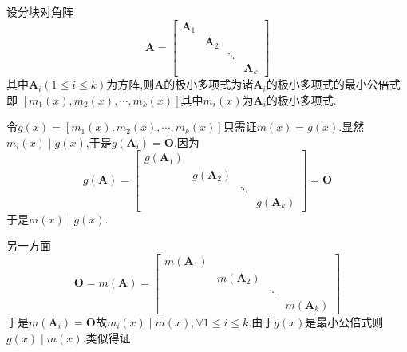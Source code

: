 \begin{formal}
\begin{proposition}[分块对角矩阵的极小多项式]\label{prop:分块对角矩阵的极小多项式}
    设分块对角阵
    \[
    \bm{A}=\begin{bmatrix}
        \bm{A}_1&&&\\
        &\bm{A}_2&&\\
        &&\ddots&\\
        &&&\bm{A}_k  
    \end{bmatrix}
    \]
    其中$\bm{A}_i\left(
        1\leqslant i\leqslant k
    \right)$为方阵,则$\bm{A}$的极小多项式为诸$\bm{A}_i$的极小多项式的最小公倍式即
   $\left[
    m_1\left(x\right),m_2\left(x\right),\cdots,m_k\left(x\right)
   \right]$其中$m_i\left(x\right)$为$\bm{A}_i$的极小多项式.
\end{proposition}
\begin{Proof}
令$g\left(x\right)=\left[
    m_1\left(x\right),m_2\left(x\right),\cdots,m_k\left(x\right)
\right]$只需证$m\left(x\right)=g\left(x\right)$.显然$m_i\left(x\right)\mid g\left(x\right)$,于是$g\left(\bm{A}_i\right)=\bm{O}$.因为\[
g\left(\bm{A}\right)=\begin{bmatrix}
    g\left(\bm{A}_1\right)&&&\\
    &g\left(\bm{A}_2\right)&&\\
    &&\ddots&\\
    &&&g\left(\bm{A}_k\right)
\end{bmatrix}=\bm{O}
\]于是$m\left(x\right)\mid g\left(x\right)$.

另一方面
\[
\bm{O}=m\left(\bm{A}\right)=\begin{bmatrix}
    m\left(\bm{A}_1\right)&&&\\
    &m\left(\bm{A}_2\right)&&\\
    &&\ddots&\\
    &&&m\left(\bm{A}_k\right)
\end{bmatrix}
\]于是$m\left(\bm{A}_i\right)=\bm{O}$故$m_i\left(x\right)\mid m\left(x\right),\forall 
1\leqslant i\leqslant k$.由于$g\left(x\right)$是最小公倍式则$g\left(x\right)\mid m\left(x\right)$.类似得证.
\end{Proof}
\end{formal}
